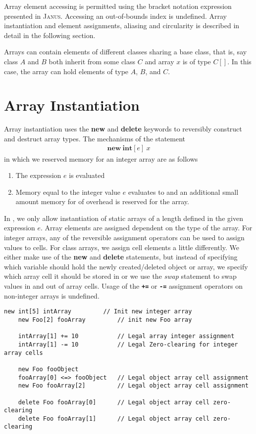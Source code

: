 Array element accessing is permitted using the bracket notation expression presented in \textsc{Janus}. Accessing an out-of-bounds index is undefined.
Array instantiation and element assignments, aliasing and circularity is described in detail in the following section.

Arrays can contain elements of different classes sharing a base class, that is, say class $A$ and $B$ both inherit from some class $C$ and array $x$ is of type $C[]$. In this case, the array can hold elements of type $A$, $B$, and $C$.

\section{Array Instantiation}
\label{sec:array-instantiation}
Array instantiation uses the \textbf{new} and \textbf{delete} keywords to reversibly construct and destruct array types. The mechanisms of the statement
\begin{align*}
\textbf{new}\ \textbf{int}[e]\ x
\end{align*} 
in which we reserved memory for an integer array are as follows

\begin{enumerate}
    \item The expression $e$ is evaluated
    \item Memory equal to the integer value $e$ evaluates to and an additional small amount memory for of overhead is reserved for the array.
\end{enumerate}

In \rooplpp, we only allow instantiation of static arrays of a length defined in the given expression $e$. Array elements are assigned dependent on the type of the array. For integer arrays, any of the reversible assignment operators can be used to assign values to cells. For class arrays, we assign cell elements a little differently. We either make use of the \textbf{new} and \textbf{delete} statements, but instead of specifying which variable should hold the newly created/deleted object or array, we specify which array cell it should be stored in or we use the \textit{swap} statement to swap values in and out of array cells. Usage of the \textbf{\texttt{+=}} or \textbf{\texttt{-=}} assignment operators on non-integer arrays is undefined.

\begin{lstlisting}[caption={Assignment of array elements}, language=roopl, style=basic,label={lst:array-assignment}]
    new int[5] intArray         // Init new integer array
    new Foo[2] fooArray         // init new Foo array

    intArray[1] += 10           // Legal array integer assignment
    intArray[1] -= 10           // Legal Zero-clearing for integer array cells

    new Foo fooObject
    fooArray[0] <=> fooObject   // Legal object array cell assignment
    new Foo fooArray[2]         // Legal object array cell assignment

    delete Foo fooArray[0]      // Legal object array cell zero-clearing
    delete Foo fooArray[1]      // Legal object array cell zero-clearing
\end{lstlisting}
 
